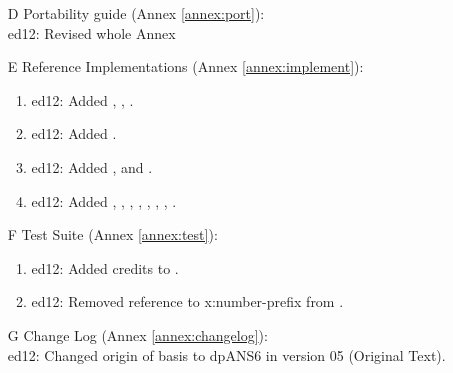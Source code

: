 \begin{itemize}
	\item[D] Portability guide (Annex \ref{annex:port}):			%
		\\ \textsf{ed12}: Revised whole Annex

	\item[E] Reference Implementations (Annex \ref{annex:implement}):	%
		\begin{enumerate}
		\item \textsf{ed12}: Added , , .
		\item \textsf{ed12}: Added .
		\item \textsf{ed12}: Added ,  and .
		\item \textsf{ed12}: Added
			,
			,
			,
			,
			,
			,
			,
			.
		\end{enumerate}
	\item[F] Test Suite (Annex \ref{annex:test}):					%
		\begin{enumerate}
		\item \textsf{ed12}: Added credits to .
		\item \textsf{ed12}: Removed reference to \textsf{x:number-prefix}
			from .
		\end{enumerate}

	\item[G] Change Log (Annex \ref{annex:changelog}): \\
		\textsf{ed12}: Changed origin of basis to dpANS6 in
			version 05 (Original Text).

	\end{itemize}

\endinput

